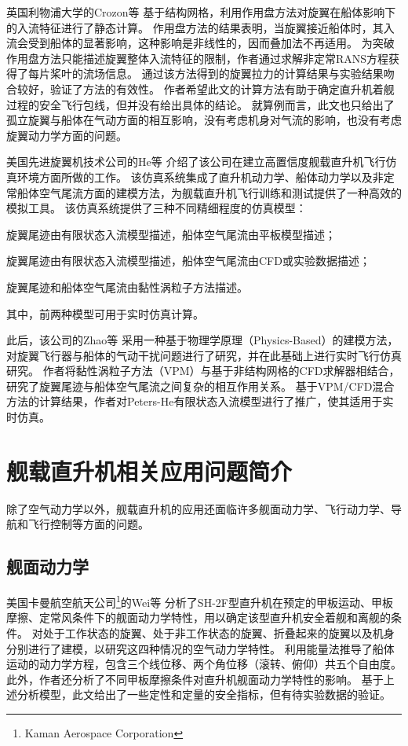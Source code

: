 英国利物浦大学的Crozon等
基于结构网格，利用作用盘方法对旋翼在船体影响下的入流特征进行了静态计算。
作用盘方法的结果表明，当旋翼接近船体时，其入流会受到船体的显著影响，这种影响是非线性的，因而叠加法不再适用。
为突破作用盘方法只能描述旋翼整体入流特征的限制，作者通过求解非定常RANS方程获得了每片桨叶的流场信息。
通过该方法得到的旋翼拉力的计算结果与实验结果吻合较好，验证了方法的有效性。
作者希望此文的计算方法有助于确定直升机着舰过程的安全飞行包线，但并没有给出具体的结论。
就算例而言，此文也只给出了孤立旋翼与船体在气动方面的相互影响，没有考虑机身对气流的影响，也没有考虑旋翼动力学方面的问题。

美国先进旋翼机技术公司的He等
介绍了该公司在建立高置信度舰载直升机飞行仿真环境方面所做的工作。
该仿真系统集成了直升机动力学、船体动力学以及非定常船体空气尾流方面的建模方法，为舰载直升机飞行训练和测试提供了一种高效的模拟工具。
该仿真系统提供了三种不同精细程度的仿真模型：
\begin{compactitem}
  \item 旋翼尾迹由有限状态入流模型描述，船体空气尾流由平板模型描述；
  \item 旋翼尾迹由有限状态入流模型描述，船体空气尾流由CFD或实验数据描述；
  \item 旋翼尾迹和船体空气尾流由黏性涡粒子方法描述。
\end{compactitem}
其中，前两种模型可用于实时仿真计算。

此后，该公司的Zhao等
采用一种基于物理学原理（Physics-Based）的建模方法，对旋翼飞行器与船体的气动干扰问题进行了研究，并在此基础上进行实时飞行仿真研究。
作者将黏性涡粒子方法（VPM）与基于非结构网格的CFD求解器相结合，研究了旋翼尾迹与船体空气尾流之间复杂的相互作用关系。
基于VPM/CFD混合方法的计算结果，作者对Peters-He有限状态入流模型进行了推广，使其适用于实时仿真。

\section{舰载直升机相关应用问题简介}
除了空气动力学以外，舰载直升机的应用还面临许多舰面动力学、飞行动力学、导航和飞行控制等方面的问题。

\subsection{舰面动力学}
美国卡曼航空航天公司\footnote{Kaman Aerospace Corporation}的Wei等
分析了SH-2F型直升机在预定的甲板运动、甲板摩擦、定常风条件下的舰面动力学特性，用以确定该型直升机安全着舰和离舰的条件。
对处于工作状态的旋翼、处于非工作状态的旋翼、折叠起来的旋翼以及机身分别进行了建模，以研究这四种情况的空气动力学特性。
利用能量法推导了船体运动的动力学方程，包含三个线位移、两个角位移（滚转、俯仰）共五个自由度。
此外，作者还分析了不同甲板摩擦条件对直升机舰面动力学特性的影响。
基于上述分析模型，此文给出了一些定性和定量的安全指标，但有待实验数据的验证。

